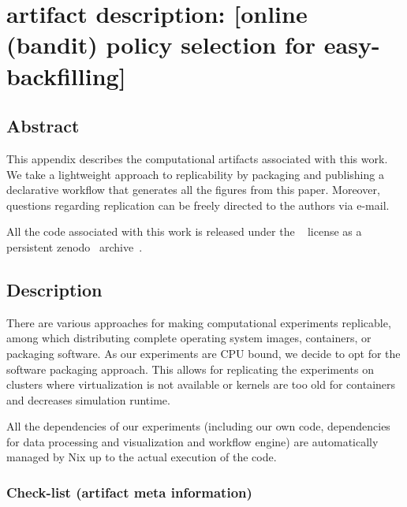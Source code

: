\documentclass[sigconf,anonymous]{acmart}
\begin{document}



\clearpage

\section{artifact description: [online (bandit) policy selection for easy-backfilling]}

\subsection{Abstract}

This appendix describes the computational artifacts associated with this work.
We take a lightweight approach to replicability by packaging and publishing a
declarative workflow that generates all the figures from this paper. Moreover,
questions regarding replication can be freely directed to the authors via
e-mail.

All the code associated with this work is released under the ~\cite{isc}
license as a persistent zenodo~\cite{zenodo} archive~\cite{repro}.

\subsection{Description}

There are various approaches for making computational experiments replicable,
among which distributing complete operating system images, containers, or
packaging software. As our experiments are CPU bound, we decide to opt for the
software packaging approach. This allows for replicating the experiments on
clusters where virtualization is not available or kernels are too old for
containers and decreases simulation runtime.

All the dependencies of our
experiments (including our own code, dependencies for data processing and
visualization and workflow engine) are automatically managed by Nix up to the
actual execution of the code.

\subsubsection{Check-list (artifact meta information)}
\end{document}
